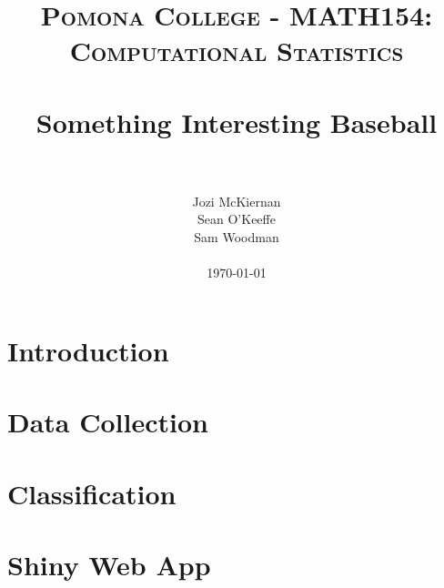 \documentclass[paper=a4, fontsize=11pt]{scrartcl}
\title{
		\usefont{OT1}{bch}{b}{n}
		\normalfont \normalsize \textsc{Pomona College - MATH154: Computational Statistics} \\ [25pt]
		\horrule{0.5pt} \\[0.4cm]
		\huge Something Interesting Baseball \\
		\horrule{2pt} \\[0.5cm]
}
\author{
		\normalfont 								\normalsize
        Jozi McKiernan\\[-3pt]		\normalsize
        Sean O'Keeffe\\[-3pt]		\normalsize
        Sam Woodman\\ \\[-3pt]		\normalsize
        \today
}
\date{}
\begin{document}


\maketitle

\section{Introduction}

\section{Data Collection}

\section{Classification}

\section{Shiny Web App}

\newpage

\nocite{*}

\end{document}

